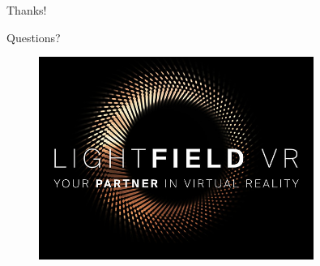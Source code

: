 \begin{frame}{Thanks!}
\begin{center}
\Large{Questions?}
\end{center}
\begin{figure}[h!]
\centering
\includegraphics[width=0.8\textwidth]{./images/lf-vr.jpg}
\end{figure}
\end{frame}

